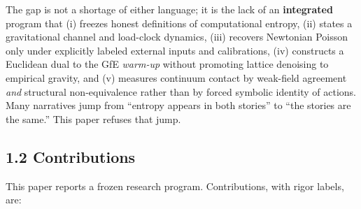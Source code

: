 \documentclass[
  11pt,
]{article}
\begin{document}
The gap is not a shortage of either language; it is the lack of an
\textbf{integrated} program that (i) freezes honest definitions of
computational entropy, (ii) states a gravitational channel and
load-clock dynamics, (iii) recovers Newtonian Poisson only under
explicitly labeled external inputs and calibrations, (iv) constructs a
Euclidean dual to the GfE \emph{warm-up} without promoting lattice
denoising to empirical gravity, and (v) measures continuum contact by
weak-field agreement \emph{and} structural non-equivalence rather than
by forced symbolic identity of actions. Many narratives jump from
``entropy appears in both stories'' to ``the stories are the same.''
This paper refuses that jump.

\subsection{1.2 Contributions}\label{contributions}

This paper reports a frozen research program. Contributions, with rigor
labels, are:
\end{document}
